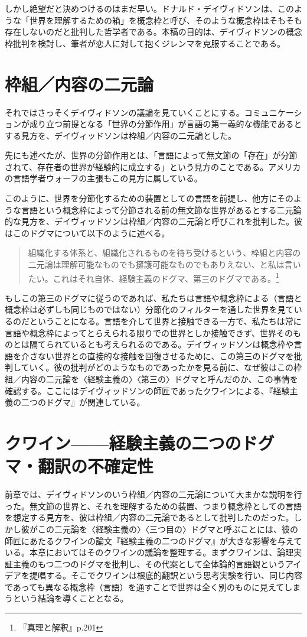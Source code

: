 \documentclass[b5j,twoside,twocolumn]{utarticle}
\begin{document}
しかし絶望だと決めつけるのはまだ早い。ドナルド・デイヴィドソンは、このような「世界を理解するための箱」を概念枠と呼び、そのような概念枠はそもそも存在しないのだと批判した哲学者である。本稿の目的は、デイヴィドソンの概念枠批判を検討し、筆者が恋人に対して抱くジレンマを克服することである。

\section{枠組／内容の二元論}
それではさっそくデイヴィドソンの議論を見ていくことにする。コミュニケーションが成り立つ前提となる「世界の分節作用」が言語の第一義的な機能であるとする見方を、デイヴィッドソンは枠組／内容の二元論とした。


先にも述べたが、世界の分節作用とは、「言語によって無文節の「存在」が分節されて、存在者の世界が経験的に成立する」という見方のことである。アメリカの言語学者ウォーフの主張もこの見方に属している。


このように、世界を分節化するための装置としての言語を前提し、他方にそのような言語という概念枠によって分節される前の無文節な世界があるとする二元論的な見方を、デイヴィッドソンは枠組／内容の二元論と呼びこれを批判した。彼はこのドグマについて以下のように述べる。
\begin{quote}
組織化する体系と、組織化されるものを待ち受けるという、枠組と内容の二元論は理解可能なものでも擁護可能なものでもありえない、と私は言いたい。これはそれ自体、経験主義のドグマ、第三のドグマである。\footnote{ 『真理と解釈』p.201}
\end{quote}


もしこの第三のドグマに従うのであれば、私たちは言語や概念枠による（言語と概念枠は必ずしも同じものではない）分節化のフィルターを通した世界を見ているのだということになる。言語を介して世界と接触できる一方で、私たちは常に言語や概念枠によってとらえられる限りでの世界としか接触できず、世界そのものとは隔てられているとも考えられるのである。デイヴィッドソンは概念枠や言語を介さない世界との直接的な接触を回復させるために、この第三のドグマを批判していく。彼の批判がどのようなものであったかを見る前に、なぜ彼はこの枠組／内容の二元論を〈経験主義の〉〈第三の〉ドグマと呼んだのか、この事情を確認する。ここにはデイヴィッドソンの師匠であったクワインによる、『経験主義の二つのドグマ』が関連している。


\section{\tbaselineshift =4.0pt クワイン------経験主義の二つのドグマ・翻訳の不確定性}
前章では、デイヴィドソンのいう枠組／内容の二元論について大まかな説明を行った。無文節の世界と、それを理解するための装置、つまり概念枠としての言語を想定する見方を、彼は枠組／内容の二元論であるとして批判したのだった。しかし彼がこの二元論を〈経験主義の〉〈三つ目の〉ドグマと呼ぶことには、彼の師匠にあたるクワインの論文『経験主義の二つのドグマ』が大きな影響を与えている。本章においてはそのクワインの議論を整理する。まずクワインは、論理実証主義のもつ二つのドグマを批判し、その代案として全体論的言語観というアイデアを提唱する。そこでクワインは根底的翻訳という思考実験を行い、同じ内容であっても異なる概念枠（言語）を通すことで世界は全く別のものに見えてしまうという結論を導くこととなる。
\end{document}
